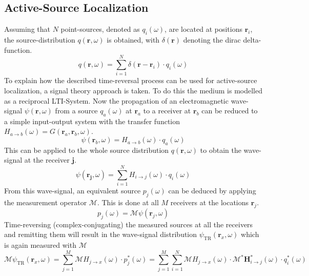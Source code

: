 \subsection{Active-Source Localization}
Assuming that \(N\) point-sources, denoted as \(q_i(\omega)\), are located at positions \(\bm{r}_i\), the source-distribution \(q(\bm{r}, \omega)\) is obtained, with \(\delta(\bm{r}) \) denoting the dirac delta-function.
\begin{equation}
    q(\bm{r}, \omega) = \sum_{i=1}^{N} \delta(\bm{r} - \bm{r}_i) \cdot q_i(\omega)
\end{equation}
To explain how the described time-reversal process can be used for active-source localization, a signal theory approach is taken.
To do this the medium is modelled as a reciprocal LTI-System.
Now the propagation of an electromagnetic wave-signal \(\psi(\bm{r}, \omega )\) from a source \(q_a(\omega )\) at \(\bm{r}_a\) to a receiver at \(\bm{r}_b\) can be reduced to a simple input-output system with the transfer function \(H_{a\rightarrow b}(\omega) = G(\bm{r}_a, \bm{r}_b, \omega)\).
\begin{equation}
    \psi(\bm{r}_b, \omega) = H_{a\rightarrow b}(\omega) \cdot q_a(\omega)
\end{equation}
This can be applied to the whole source distribution \(q(\bm{r}, \omega)\) to obtain the wave-signal at the receiver \(\bm{j}\).
\begin{equation}
    \psi(\bm{r_j}, \omega) = \sum_{i=1}^{N} H_{i\rightarrow j}(\omega) \cdot q_i(\omega)
\end{equation}
From this wave-signal, an equivalent source \(p_j(\omega)\) can be deduced by applying the measurement operator \(\mathcal{M}\). This is done at all \(M\) receivers at the locations \(\bm{r}_j\).  
\begin{equation}
    p_j(\omega) = \mathcal{M} \psi(\bm{r}_j, \omega)
\end{equation}
Time-reversing (complex-conjugating) the measured sources at all the receivers and remitting them will result in the wave-signal distribution \(\psi_{\text{TR}}(\bm{r}_x, \omega)\) which is again measured with \(\mathcal{M}\)
\begin{equation}\label{signal-time-reversal}
    \mathcal{M} \psi_{\text{TR}}(\bm{r}_x, \omega) = \sum_{j=1}^{M} \mathcal{M} H_{j\rightarrow x}(\omega ) \cdot p_j^*(\omega) = \sum_{j=1}^{M} \sum_{i=1}^{N} \mathcal{M} H_{j\rightarrow x}(\omega) \cdot \mathcal{M}^* \bm{H}^*_{i\rightarrow j}(\omega) \cdot q^*_i(\omega)
\end{equation}
